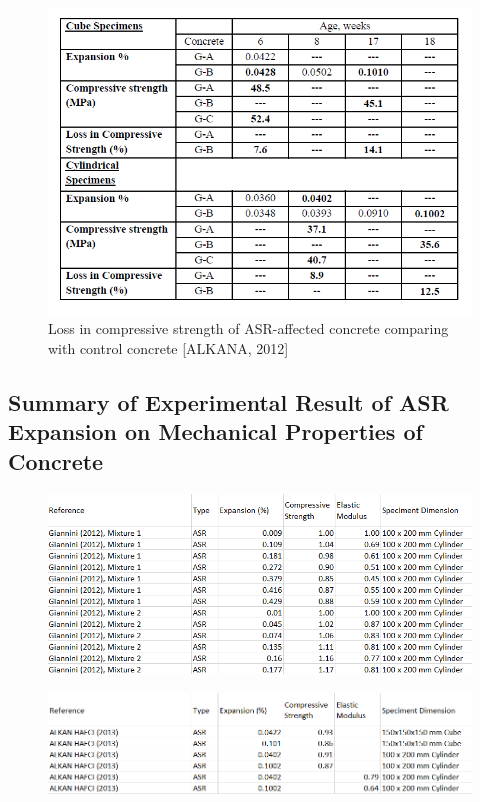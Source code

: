 \begin{figure}[h!]
  \centering
  \includegraphics[width=1.0\linewidth]{Reference/ALKANASR3.png}
  \caption{Loss in compressive strength of ASR-affected concrete comparing with control concrete [ALKANA, 2012\cite{ALKANA}]}
  \label{ALKANA3}
\end{figure}

\clearpage
\subsection{Summary of Experimental Result of ASR Expansion on Mechanical Properties of Concrete}

\begin{figure}[h!]
  \centering
  \includegraphics[width=1.0\linewidth]{Reference/GIANNINIASRdata.png}
\end{figure}

\begin{figure}[h!]
  \centering
  \includegraphics[width=1.0\linewidth]{Reference/ALKANASRdata.png}
\end{figure}

